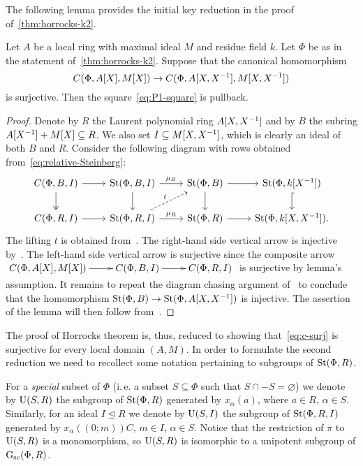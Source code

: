 The following lemma provides the initial key reduction in the proof of~\cref{thm:horrocks-k2}.
\begin{lemma} \label{lem:first-reduction}
Let $A$ be a local ring with maximal ideal $M$ and residue field $k$.
Let $\Phi$ be as in the statement of~\cref{thm:horrocks-k2}.
Suppose that the canonical homomorphism
\begin{equation} \label{eq:c-surj} C(\Phi, A[X], M[X]) \to C(\Phi, A[X, X^{-1}], M[X, X^{-1}]) \end{equation}
is surjective.
Then the square~\eqref{eq:P1-square} is pullback.
\end{lemma}
\begin{proof}
    Denote by $R$ the Laurent polynomial ring $A[X, X^{-1}]$ and by $B$ the subring $A[X^{-1}] + M[X] \subseteq R$.
    We also set $I \subseteq M[X, X^{-1}]$, which is clearly an ideal of both $B$ and $R$.
    Consider the following diagram with rows obtained from~\eqref{eq:relative-Steinberg}:
    \[\begin{tikzcd}
          C(\Phi, B, I) \arrow{r} \arrow[d, swap, twoheadrightarrow] & \St(\Phi, B, I) \arrow{r}{\mu_B} \arrow{d} & \St(\Phi, B) \arrow{r} \arrow{d} & \St(\Phi, k[X^{-1}]) \arrow[hookrightarrow]{d} \\
          C(\Phi, R, I) \arrow{r} & \St(\Phi, R, I) \arrow{r}{\mu_R} \arrow[ur, "t", dashrightarrow] & \St(\Phi, R) \arrow{r} & \St(\Phi, k[X, X^{-1}]).
    \end{tikzcd}\]
    The lifting $t$ is obtained from~\cite[Lemma~3.3]{LS20}.
    The right-hand side vertical arrow is injective by~\cite[Lemma~2.2]{LS20}.
    The left-hand side vertical arrow is surjective since the composite arrow
    $\xymatrix{ C(\Phi, A[X], M[X]) \ar[r] & C(\Phi, B, I) \ar[r] & C(\Phi, R, I) }$
    is surjective by lemma's assumption.
    It remains to repeat the diagram chasing argument of~\cite[Theorem~1]{LS20} to conclude that the homomorphism $\operatorname{St}(\Phi, B) \to \operatorname{St}(\Phi, A[X, X^{-1}])$ is injective.
    The assertion of the lemma will then follow from~\cite[Theorem~3]{LS20}.
\end{proof}
The proof of Horrocks theorem is, thus, reduced to showing that~\eqref{eq:c-surj} is surjective for every local domain $(A, M)$.
In order to formulate the second reduction we need to recollect some notation pertaining to subgroups of $\operatorname{St}(\Phi, R)$.

For a \textit{special} subset of $\Phi$ (i.\,e. a subset $S \subseteq \Phi$ such that $S \cap -S = \varnothing$)
we denote by $\operatorname{U}(S, R)$ the subgroup of $\operatorname{St}(\Phi, R)$ generated by $x_\alpha(a)$, where $a \in R$, $\alpha \in S$.
Similarly, for an ideal $I \trianglelefteq R$ we denote by $\operatorname{U}(S, I)$ the subgroup of $\operatorname{St}(\Phi, R, I)$ generated by $x_\alpha((0;m))C$, $m \in I$, $\alpha \in S$.
Notice that the restriction of $\pi$ to $\operatorname{U}(S, R)$ is a monomorphism, so $\operatorname{U}(S, R)$ is isomorphic to a unipotent subgroup of $\operatorname{G}_\mathrm{sc}(\Phi, R)$.

